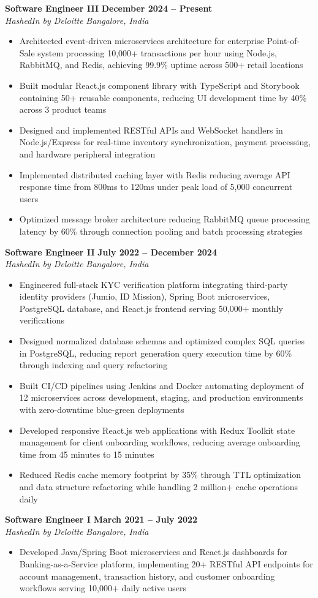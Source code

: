 \documentclass[letterpaper,11pt]{article}
\newcommand{\resumeItem}[1]{
  \item\small{
    {#1 \vspace{-2pt}}
  }
}
\newcommand{\resumeSubheading}[4]{
  \vspace{-2pt}\item
    \textbf{#1} \hfill \textbf{\small #2} \\
    \textit{\small#3} \hfill \textit{\small #4}
  \vspace{-7pt}
}
\newcommand{\resumeItemListStart}{\begin{itemize}}
\newcommand{\resumeItemListEnd}{\end{itemize}\vspace{-5pt}}
\begin{document}
    \resumeSubheading
      {Software Engineer III}{December 2024 -- Present}
      {HashedIn by Deloitte}{Bangalore, India}
      \resumeItemListStart
        \resumeItem{Architected event-driven microservices architecture for enterprise Point-of-Sale system processing 10,000+ transactions per hour using Node.js, RabbitMQ, and Redis, achieving 99.9\% uptime across 500+ retail locations}
        \resumeItem{Built modular React.js component library with TypeScript and Storybook containing 50+ reusable components, reducing UI development time by 40\% across 3 product teams}
        \resumeItem{Designed and implemented RESTful APIs and WebSocket handlers in Node.js/Express for real-time inventory synchronization, payment processing, and hardware peripheral integration}
        \resumeItem{Implemented distributed caching layer with Redis reducing average API response time from 800ms to 120ms under peak load of 5,000 concurrent users}
        \resumeItem{Optimized message broker architecture reducing RabbitMQ queue processing latency by 60\% through connection pooling and batch processing strategies}
      \resumeItemListEnd

    \resumeSubheading
      {Software Engineer II}{July 2022 -- December 2024}
      {HashedIn by Deloitte}{Bangalore, India}
      \resumeItemListStart
        \resumeItem{Engineered full-stack KYC verification platform integrating third-party identity providers (Jumio, ID Mission), Spring Boot microservices, PostgreSQL database, and React.js frontend serving 50,000+ monthly verifications}
        \resumeItem{Designed normalized database schemas and optimized complex SQL queries in PostgreSQL, reducing report generation query execution time by 60\% through indexing and query refactoring}
        \resumeItem{Built CI/CD pipelines using Jenkins and Docker automating deployment of 12 microservices across development, staging, and production environments with zero-downtime blue-green deployments}
        \resumeItem{Developed responsive React.js web applications with Redux Toolkit state management for client onboarding workflows, reducing average onboarding time from 45 minutes to 15 minutes}
        \resumeItem{Reduced Redis cache memory footprint by 35\% through TTL optimization and data structure refactoring while handling 2 million+ cache operations daily}
      \resumeItemListEnd

    \resumeSubheading
      {Software Engineer I}{March 2021 -- July 2022}
      {HashedIn by Deloitte}{Bangalore, India}
      \resumeItemListStart
        \resumeItem{Developed Java/Spring Boot microservices and React.js dashboards for Banking-as-a-Service platform, implementing 20+ RESTful API endpoints for account management, transaction history, and customer onboarding workflows serving 10,000+ daily active users}
      \resumeItemListEnd
\end{document}
